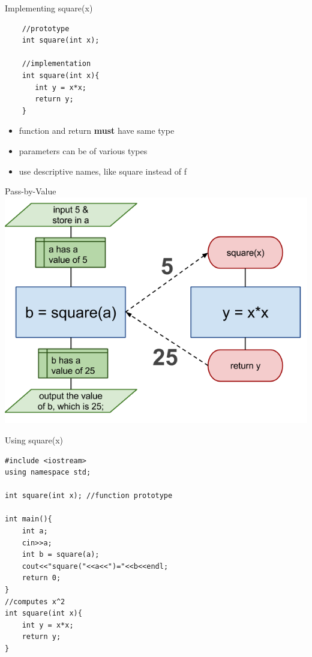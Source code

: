 \documentclass[xcolor={dvipsnames}]{beamer}
\begin{document}
\begin{frame}[fragile]{Implementing square(x)}
	\begin{center}
	 
	\begin{verbatim}
	//prototype
	int square(int x);

	//implementation
	int square(int x){
	   int y = x*x;
	   return y;
	}   
	\end{verbatim}
	\end{center}
	\begin{center}
		\begin{itemize}
			\item function and return \textbf{must} have same type
			\item parameters can be of various types
			\item use descriptive names, like square instead of f
		\end{itemize}
	\end{center}
\end{frame}

\begin{frame}{ Pass-by-Value}
	\includegraphics[width=1\textwidth]{fsq_pbv}
\end{frame}

\begin{frame}[fragile]{Using square(x)}
	\begin{verbatim}
#include <iostream>
using namespace std;

int square(int x); //function prototype

int main(){
    int a;
    cin>>a;
    int b = square(a);
    cout<<"square("<<a<<")="<<b<<endl;
    return 0;
}
//computes x^2
int square(int x){
    int y = x*x;
    return y;
}   
	\end{verbatim}
\end{frame}
\end{document}
